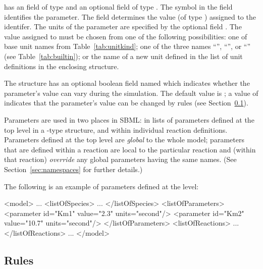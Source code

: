 \documentclass[10pt,twocolumntoc]{cekarticle}
\newcommand{\vref}[1]{\ref{#1}}
\begin{document}
 has an  field of type  and
an optional  field of type .  The
symbol in the  field identifies the parameter.  The
field  determines the value (of type )
assigned to the identifer.  The units of the parameter
 are specified by the optional field .
The value assigned to  must be chosen from one of
the following possibilities: one of base unit names from
Table~\vref{tab:unitkind}; one of the three names
``'', ``'', or
``'' (see Table~\ref{tab:builtin}); or the name of
a new unit defined in the list of unit definitions in the
enclosing  structure.

The  structure has an optional boolean field named
 which indicates whether the parameter's value can vary
during the simulation.  The default value is ; a value of
 indicates that the parameter's value can be changed by
rules (see Section~\ref{sec:rules}).

Parameters are used in two places in SBML: in lists of parameters defined
at the top level in a -type structure, and within individual
reaction definitions.  Parameters defined at the top level are
\emph{global} to the whole model; parameters that are defined within
a reaction are local to the particular reaction and (within that reaction)
\emph{override} any global parameters having the same names.  (See
Section~\ref{sec:namespaces} for further details.)

The following is an example of parameters defined at the  level:

\begin{example}
<model>
    ...
    <listOfSpecies>
        ...
    </listOfSpecies>
    <listOfParameters>
        <parameter id="Km1" value="2.3" units="second"/>
        <parameter id="Km2" value="10.7" units="second"/>
    </listOfParameters>
    <listOfReactions>
        ...
    </listOfReactions>
    ...
</model>
\end{example}

\subsection{Rules}
\label{sec:rules}
\end{document}
